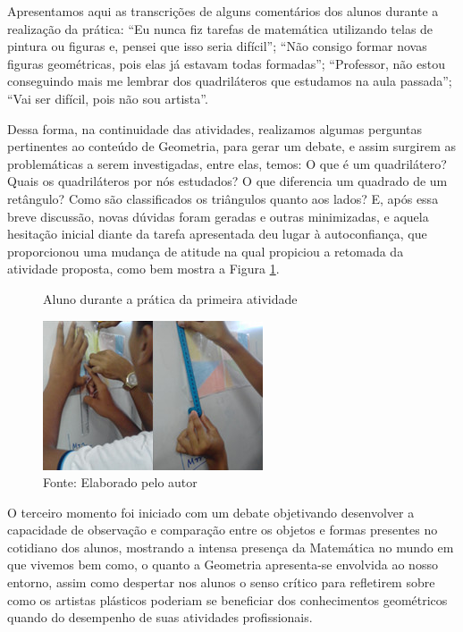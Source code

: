 \begin{refsection}
    Apresentamos aqui as transcrições de alguns comentários dos alunos durante a realização da prática: “Eu nunca fiz tarefas de matemática utilizando telas de pintura ou figuras e, pensei que isso seria difícil”; “Não consigo formar novas figuras geométricas, pois elas já estavam todas formadas”; “Professor, não estou conseguindo mais me lembrar dos quadriláteros que estudamos na aula passada”; “Vai ser difícil, pois não sou artista”.  

    Dessa forma, na continuidade das atividades, realizamos algumas perguntas pertinentes ao conteúdo de Geometria, para gerar um debate, e assim surgirem as problemáticas a serem investigadas, entre elas, temos: O que é um quadrilátero? Quais os quadriláteros por nós estudados? O que diferencia um quadrado de um retângulo? Como são classificados os triângulos quanto aos lados? E, após essa breve discussão, novas dúvidas foram geradas e outras minimizadas, e aquela hesitação inicial diante da tarefa apresentada deu lugar à autoconfiança, que proporcionou uma mudança de atitude na qual propiciou a retomada da atividade proposta, como bem mostra a Figura \ref{fig:aluno-durante-pratica}.

    \begin{figure}[ht]%
        \centering%
        \caption{Aluno durante a prática da primeira atividade}%
        \includegraphics[width=.6\textwidth]{articles/04-matematica-na-arte--/figura6.jpg}%
        \caption*{Fonte: Elaborado pelo autor}%
        \label{fig:aluno-durante-pratica}%
    \end{figure}%

    O terceiro momento foi iniciado com um debate objetivando desenvolver a capacidade de observação e comparação entre os objetos e formas presentes no cotidiano dos alunos, mostrando a intensa presença da Matemática no mundo em que vivemos bem como, o quanto a Geometria apresenta-se envolvida ao nosso entorno, assim como despertar nos alunos o senso crítico para refletirem sobre como os artistas plásticos poderiam se beneficiar dos conhecimentos geométricos quando do desempenho de suas atividades profissionais.  


\end{refsection}
